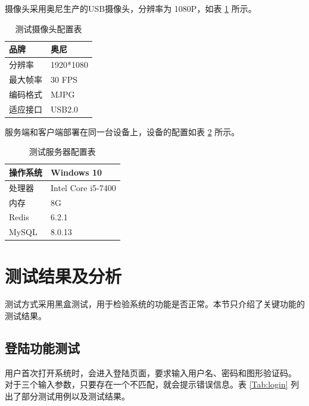 摄像头采用奥尼生产的USB摄像头，分辨率为 1080P，如表 \ref{Tab:cam} 所示。
\begin{longtable}[ht]{|l|l|}
    \caption{测试摄像头配置表}
    \label{Tab:cam}\\
    \hline
    品牌&奥尼\\
    \hline
    分辨率&1920*1080\\
    \hline
    最大帧率&30 FPS\\
    \hline
    编码格式&MJPG \\
    \hline
    适应接口&USB2.0\\
    \hline
    \end{longtable}

服务端和客户端部署在同一台设备上，设备的配置如表 \ref{Tab:conf} 所示。

\begin{longtable}[ht]{|l|l|}
\caption{测试服务器配置表}
\label{Tab:conf}\\
\hline
操作系统&Windows 10\\
\hline
处理器&Intel Core i5-7400\\
\hline
内存&8G\\
\hline
Redis&6.2.1 \\
\hline
MySQL&8.0.13\\
\hline
\end{longtable}

\section{测试结果及分析}
测试方式采用黑盒测试，用于检验系统的功能是否正常。本节只介绍了关键功能的测试结果。
\subsection{登陆功能测试}
用户首次打开系统时，会进入登陆页面，要求输入用户名、密码和图形验证码。
对于三个输入参数，只要存在一个不匹配，就会提示错误信息。表 \ref{Tab:login} 列出了部分测试用例以及测试结果。

